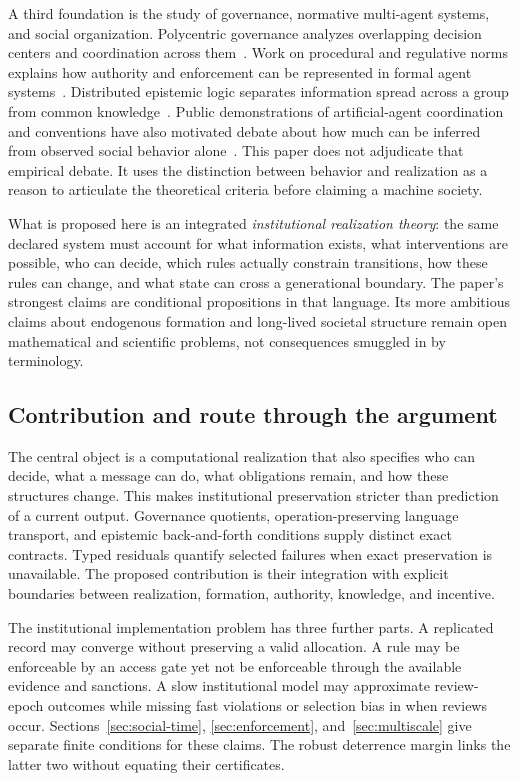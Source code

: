 \documentclass[11pt,letterpaper]{article}
\theoremstyle{plain}
\theoremstyle{definition}
\theoremstyle{remark}
\begin{document}
A third foundation is the study of governance, normative multi-agent systems, and social organization. Polycentric governance analyzes overlapping decision centers and coordination across them~\cite{ostrom,ostrombook}. Work on procedural and regulative norms explains how authority and enforcement can be represented in formal agent systems~\cite{boella,grossinorm}. Distributed epistemic logic separates information spread across a group from common knowledge~\cite{halpernmoses}. Public demonstrations of artificial-agent coordination and conventions have also motivated debate about how much can be inferred from observed social behavior alone~\cite{park,ashery,barrie,asheryreply}. This paper does not adjudicate that empirical debate. It uses the distinction between behavior and realization as a reason to articulate the theoretical criteria before claiming a machine society.

What is proposed here is an integrated \emph{institutional realization theory}: the same declared system must account for what information exists, what interventions are possible, who can decide, which rules actually constrain transitions, how these rules can change, and what state can cross a generational boundary. The paper's strongest claims are conditional propositions in that language. Its more ambitious claims about endogenous formation and long-lived societal structure remain open mathematical and scientific problems, not consequences smuggled in by terminology.

\subsection{Contribution and route through the argument}
The central object is a computational realization that also specifies who can decide, what a message can do, what obligations remain, and how these structures change. This makes institutional preservation stricter than prediction of a current output. Governance quotients, operation-preserving language transport, and epistemic back-and-forth conditions supply distinct exact contracts. Typed residuals quantify selected failures when exact preservation is unavailable. The proposed contribution is their integration with explicit boundaries between realization, formation, authority, knowledge, and incentive.

The institutional implementation problem has three further parts. A replicated record may converge without preserving a valid allocation. A rule may be enforceable by an access gate yet not be enforceable through the available evidence and sanctions. A slow institutional model may approximate review-epoch outcomes while missing fast violations or selection bias in when reviews occur. Sections~\ref{sec:social-time}, \ref{sec:enforcement}, and~\ref{sec:multiscale} give separate finite conditions for these claims. The robust deterrence margin links the latter two without equating their certificates.
\end{document}
